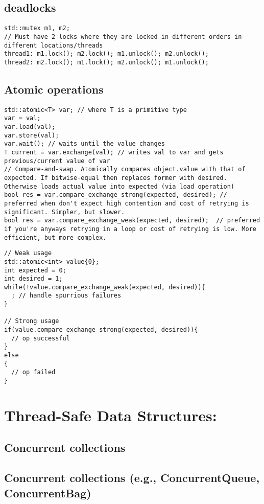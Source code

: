 \documentclass{article}
\begin{document}
\subsection{ deadlocks}
\begin{lstlisting}[style=cpp]
std::mutex m1, m2;
// Must have 2 locks where they are locked in different orders in different locations/threads
thread1: m1.lock(); m2.lock(); m1.unlock(); m2.unlock();
thread2: m2.lock(); m1.lock(); m2.unlock(); m1.unlock();
          \end{lstlisting}
\subsection{ Atomic operations}
\begin{lstlisting}[style=cpp]
std::atomic<T> var; // where T is a primitive type
var = val;
var.load(val);
var.store(val);
var.wait(); // waits until the value changes
T current = var.exchange(val); // writes val to var and gets previous/current value of var
// Compare-and-swap. Atomically compares object.value with that of expected. If bitwise-equal then replaces former with desired. Otherwise loads actual value into expected (via load operation)
bool res = var.compare_exchange_strong(expected, desired); // preferred when don't expect high contention and cost of retrying is significant. Simpler, but slower.
bool res = var.compare_exchange_weak(expected, desired);  // preferred if you're anyways retrying in a loop or cost of retrying is low. More efficient, but more complex.
              \end{lstlisting}
\begin{lstlisting}[style=cpp]
// Weak usage
std::atomic<int> value{0};
int expected = 0;
int desired = 1;
while(!value.compare_exchange_weak(expected, desired)){
  ; // handle spurrious failures
}

// Strong usage
if(value.compare_exchange_strong(expected, desired)){
  // op successful
}
else
{
  // op failed
}
              \end{lstlisting}

\section{Thread-Safe Data Structures:}
\subsection{ Concurrent collections}
\subsection{ Concurrent collections (e.g., ConcurrentQueue, ConcurrentBag)}
\end{document}
